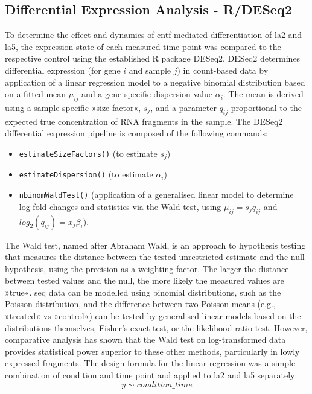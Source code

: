 \subsection{Differential Expression Analysis - R/DESeq2} \label{sec:cellculture:deseq}
To determine the effect and dynamics of \ac{cntf}-mediated differentiation of \ac{la2} and \ac{la5}, the expression state of each measured time point was compared to the respective control using the established R package DESeq2\cite{Love2014}. DESeq2 determines differential expression (for gene $i$ and sample $j$) in count-based data by application of a linear regression model to a negative binomial distribution based on a fitted mean $\mu_{ij}$ and a gene-specific dispersion value $\alpha_i$. The mean is derived using a sample-specific »size factor«, $s_j$, and a parameter $q_{ij}$ proportional to the expected true concentration of RNA fragments in the sample. The DESeq2 differential expression pipeline is composed of the following commands:
\begin{itemize}
\item \texttt{estimateSizeFactors()} (to estimate $s_j$)
\item \texttt{estimateDispersion()} (to estimate $\alpha_i$)
\item \texttt{nbinomWaldTest()} (application of a generalised linear model to determine log-fold changes and statistics via the Wald test, using $\mu_{ij} = s_jq_{ij}$ and $log_2(q_{ij}) = x_j\beta_i$).
\end{itemize}
The Wald test, named after Abraham Wald, is an approach to hypothesis testing that measures the distance between the tested unrestricted estimate and the null hypothesis, using the precision as a weighting factor. The larger the distance between tested values and the null, the more likely the measured values are »true«. \ac{seq} data can be modelled using binomial distributions\cite{Bullard2010}, such as the Poisson distribution, and the difference between two Poisson means (e.g., »treated« vs »control«) can be tested by generalised linear models based on the distributions themselves, Fisher's exact test, or the likelihood ratio test. However, comparative analysis has shown that the Wald test on log-transformed data provides statistical power superior to these other methods\cite{Chen2011}, particularly in lowly expressed fragments. The design formula for the linear regression was a simple combination of condition and time point and applied to \ac{la2} and \ac{la5} separately: $$y \sim condition\_time$$

